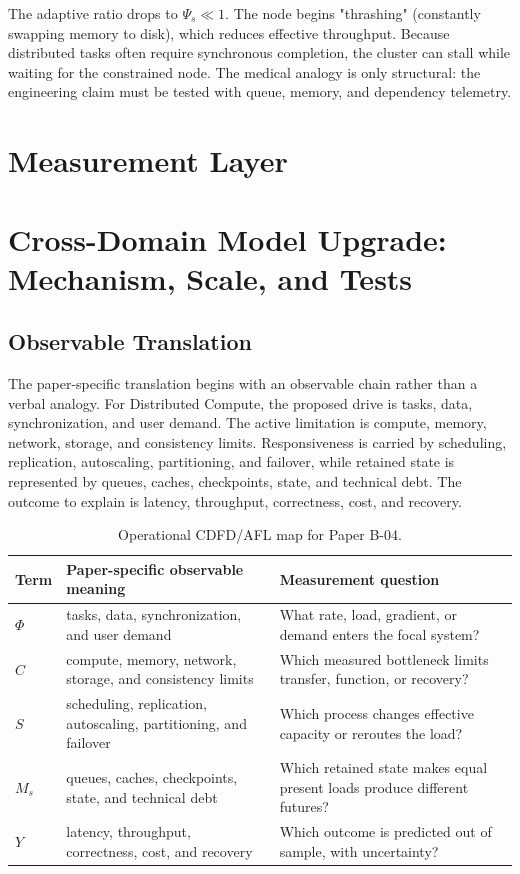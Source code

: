 \documentclass[11pt,a4paper]{article}
\begin{document}
The adaptive ratio drops to $\Psi_s \ll 1$. The node begins "thrashing" (constantly swapping memory to disk), which reduces effective throughput. Because distributed tasks often require synchronous completion, the cluster can stall while waiting for the constrained node. The medical analogy is only structural: the engineering claim must be tested with queue, memory, and dependency telemetry.



\section{Measurement Layer}

\section{Cross-Domain Model Upgrade: Mechanism, Scale, and Tests}

\subsection{Observable Translation}

The paper-specific translation begins with an observable chain rather than a
verbal analogy. For Distributed Compute, the proposed drive is tasks, data, synchronization, and user demand.
The active limitation is compute, memory, network, storage, and consistency limits. Responsiveness is carried by
scheduling, replication, autoscaling, partitioning, and failover, while retained state is represented by
queues, caches, checkpoints, state, and technical debt. The outcome to explain is latency, throughput, correctness, cost, and recovery.

\begin{table}[htbp]
\centering
\small
\caption{Operational CDFD/AFL map for Paper B-04.}
\begin{tabularx}{\textwidth}{|l|X|X|}
\hline
\textbf{Term} & \textbf{Paper-specific observable meaning} & \textbf{Measurement question} \\
\hline
$\Phi$ & tasks, data, synchronization, and user demand & What rate, load, gradient, or demand enters the focal system? \\
\hline
$C$ & compute, memory, network, storage, and consistency limits & Which measured bottleneck limits transfer, function, or recovery? \\
\hline
$S$ & scheduling, replication, autoscaling, partitioning, and failover & Which process changes effective capacity or reroutes the load? \\
\hline
$M_s$ & queues, caches, checkpoints, state, and technical debt & Which retained state makes equal present loads produce different futures? \\
\hline
$Y$ & latency, throughput, correctness, cost, and recovery & Which outcome is predicted out of sample, with uncertainty? \\
\hline
\end{tabularx}
\end{table}
\end{document}
